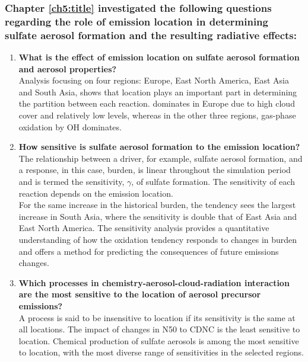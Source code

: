 \subsubsection*{Chapter \ref{ch5:title} investigated the following questions regarding the role of emission location in determining sulfate aerosol formation and the resulting radiative effects:}

   \begin{enumerate}[resume]
    \item \textbf{What is the effect of emission location on sulfate aerosol formation and aerosol properties?}\\
    Analysis focusing on four regions: Europe, East North America, East Asia and South Asia, shows that location plays an important part in determining the partition between each reaction.  dominates in Europe due to high cloud cover and relatively low  levels, whereas in the other three regions, gas-phase oxidation by OH dominates. \add[VS]{\\}
    \item \textbf{How sensitive is sulfate aerosol formation to the emission location?}\\
    The relationship between a driver, for example, sulfate aerosol formation, and a response, in this case,  burden, is linear throughout the simulation period and is termed the sensitivity, $\gamma$, of sulfate formation. The sensitivity of each reaction depends on the emission location.\\
    For the same increase in the historical  burden, the  tendency sees the largest increase in South Asia, where the sensitivity is double that of East Asia and East North America. The sensitivity analysis provides a quantitative understanding of how the oxidation tendency responds to changes in  burden and offers a method for predicting the consequences of future emissions changes.
    \item \textbf{Which processes in chemistry-aerosol-cloud-radiation interaction are the most sensitive to the location of aerosol precursor emissions?}\\
    A process is said to be insensitive to location if its sensitivity is the same at all locations. The impact of changes in N50 to CDNC is the least sensitive to location. Chemical production of sulfate aerosols is among the most sensitive to location, with the most diverse range of sensitivities in the selected regions.\\
    \end{enumerate}


